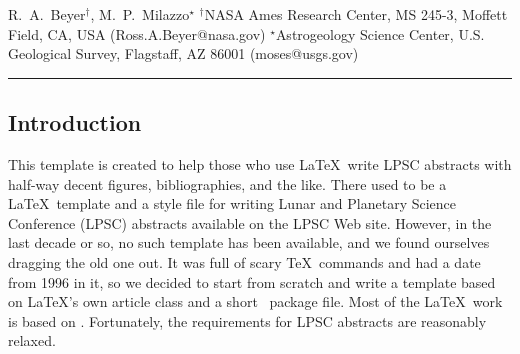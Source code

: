 \documentclass[twoside]{article}
\begin{document}

{R.~A.~Beyer$^{\dag}$, M.~P.~Milazzo$^{\star}$ $^{\dag}$NASA Ames Research Center, MS 245-3, Moffett Field, CA, USA (Ross.A.Beyer@nasa.gov) $^{\star}$Astrogeology Science Center, U.S. Geological Survey, Flagstaff, AZ 86001 (moses@usgs.gov) \\ \hrule
} 

%

%


\balance



\subsection*{Introduction} This template is created to help those who use
\LaTeX\ write LPSC abstracts with half-way decent figures, bibliographies, 
and the like. There used to be a \LaTeX\ template and a style file for writing
Lunar and Planetary Science Conference (LPSC) abstracts available
on the LPSC Web site.  However, in the last decade or so, no
such template has been available, and we found ourselves dragging
the old one out.  It was full of scary \TeX\ commands and had a
date from 1996 in it, so we decided to start from scratch and write
a template based on \LaTeX's own article class and a short \LaTeXe\
package file.  Most of the \LaTeX\ work is based on \citep{kopka2003guide}.
Fortunately, the requirements for LPSC abstracts \citep{LPSC} are
reasonably relaxed.
\end{document}
